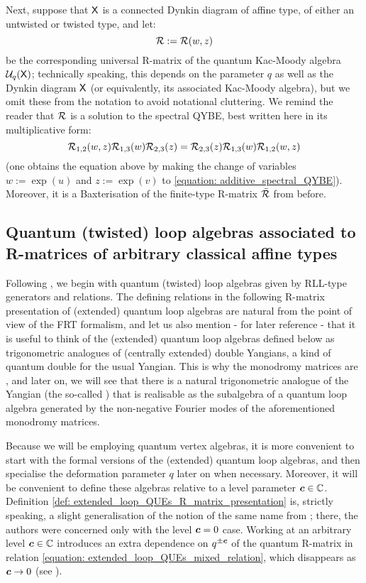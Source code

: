         Next, suppose that $\mathsf{X}$ is a connected Dynkin diagram of affine type, of either an untwisted or twisted type, and let:
            $$\mathcal{R} := \mathcal{R}(w, z)$$
        be the corresponding universal R-matrix of the quantum Kac-Moody algebra $\mathcal{U}_q(\mathsf{X})$; technically speaking, this depends on the parameter $q$ as well as the Dynkin diagram $\mathsf{X}$ (or equivalently, its associated Kac-Moody algebra), but we omit these from the notation to avoid notational cluttering. We remind the reader that $\mathcal{R}$ is a solution to the spectral QYBE, best written here in its multiplicative form:
            \begin{equation} \label{equation: multiplicative_spectral_QYBE}
                \mathcal{R}_{1, 2}(w, z) \mathcal{R}_{1, 3}(w) \mathcal{R}_{2, 3}(z) = \mathcal{R}_{2, 3}(z) \mathcal{R}_{1, 3}(w) \mathcal{R}_{1, 2}(w, z)
            \end{equation}
        (one obtains the equation above by making the change of variables $w := \exp(u)$ and $z := \exp(v)$ to \eqref{equation: additive_spectral_QYBE}). Moreover, it is a Baxterisation of the finite-type R-matrix $\bar{\mathcal{R}}$ from before. 

    \subsection{Quantum (twisted) loop algebras associated to R-matrices of arbitrary classical affine types}
        Following \cite{guay_regelskis_wendlandt_R_matrix_presentation_of_loop_QUEs}, we begin with quantum (twisted) loop algebras given by RLL-type generators and relations. The defining relations in the following R-matrix presentation of (extended) quantum loop algebras are natural from the point of view of the FRT formalism, and let us also mention - for later reference - that it is useful to think of the (extended) quantum loop algebras defined below as trigonometric analogues of (centrally extended) double Yangians, a kind of quantum double for the usual Yangian. This is why the monodromy matrices are , and later on, we will see that there is a natural trigonometric analogue of the Yangian (the so-called ) that is realisable as the subalgebra of a quantum loop algebra generated by the non-negative Fourier modes of the aforementioned monodromy matrices.

        Because we will be employing quantum vertex algebras, it is more convenient to start with the formal versions of the (extended) quantum loop algebras, and then specialise the deformation parameter $q$ later on when necessary. Moreover, it will be convenient to define these algebras relative to a level parameter $\boldsymbol{c} \in \mathbb{C}$. Definition \ref{def: extended_loop_QUEs_R_matrix_presentation} is, strictly speaking, a slight generalisation of the notion of the same name from \cite{guay_regelskis_wendlandt_R_matrix_presentation_of_loop_QUEs}; there, the authors were concerned only with the level $\boldsymbol{c} = 0$ case. Working at an arbitrary level $\boldsymbol{c} \in \mathbb{C}$ introduces an extra dependence on $q^{\pm \boldsymbol{c}}$ of the quantum R-matrix in relation \eqref{equation: extended_loop_QUEs_mixed_relation}, which disappears as $\boldsymbol{c} \to 0$ (see \cite[Remark 3.6]{guay_regelskis_wendlandt_R_matrix_presentation_of_loop_QUEs}). 

